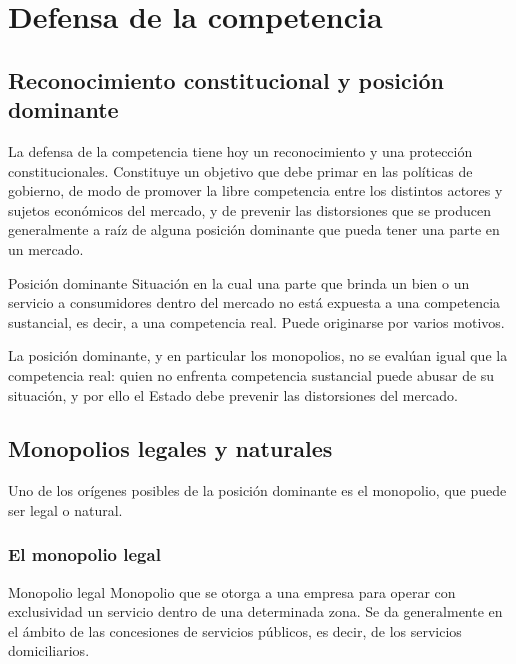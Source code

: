 \documentclass[12pt,oneside]{book}
\begin{document}
\chapter{Defensa de la competencia}

\section{Reconocimiento constitucional y posición dominante}

La defensa de la competencia tiene hoy un reconocimiento y una protección constitucionales. Constituye un objetivo que debe primar en las políticas de gobierno, de modo de promover la libre competencia entre los distintos actores y sujetos económicos del mercado, y de prevenir las distorsiones que se producen generalmente a raíz de alguna posición dominante que pueda tener una parte en un mercado.

\begin{definition}{Posición dominante}
Situación en la cual una parte que brinda un bien o un servicio a consumidores dentro del mercado no está expuesta a una competencia sustancial, es decir, a una competencia real. Puede originarse por varios motivos.
\end{definition}

\begin{important}
La posición dominante, y en particular los monopolios, no se evalúan igual que la competencia real: quien no enfrenta competencia sustancial puede abusar de su situación, y por ello el Estado debe prevenir las distorsiones del mercado.
\end{important}

\section{Monopolios legales y naturales}

Uno de los orígenes posibles de la posición dominante es el monopolio, que puede ser legal o natural.

\subsection{El monopolio legal}

\begin{definition}{Monopolio legal}
Monopolio que se otorga a una empresa para operar con exclusividad un servicio dentro de una determinada zona. Se da generalmente en el ámbito de las concesiones de servicios públicos, es decir, de los servicios domiciliarios.
\end{definition}
\end{document}
